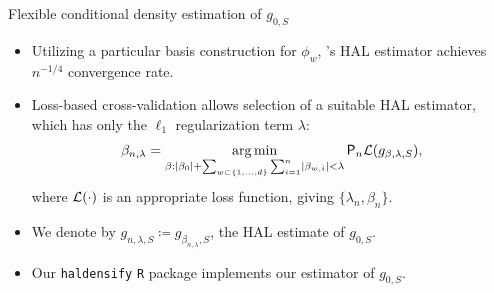 \documentclass{beamer}
\begin{document}
\begin{frame}[c]{Flexible conditional density estimation of $g_{0,S}$}

\begin{center}
\begin{itemize}
  \itemsep8pt
  \item Utilizing a particular basis construction for $\phi_w$,
    \citet{vdl2017generally}'s HAL estimator achieves $n^{-1/4}$
    convergence rate\footnotemark.
  \item Loss-based cross-validation allows selection of a suitable HAL
    estimator, which has only the $\ell_1$ regularization term $\lambda$:
    {\small{
    \begin{equation*}
      \beta_{n, \lambda}= \operatorname*{arg\,min}_{\beta: \lvert \beta_0 \rvert + \sum_{w
        \subset\{1,\ldots,d\}} \sum_{i=1}^{n} \lvert \beta_{w,i} \rvert <
        \lambda} \mathsf{P}_n \mathcal{L}(g_{\beta,\lambda,S}),
    \end{equation*} }
    }
    where $\mathcal{L}(\cdot)$ is an appropriate loss function, giving
    $\{\lambda_n, \beta_n\}$.
  \item We denote by $g_{n,\lambda,S} \coloneqq g_{\beta_{n, \lambda},S}$, the
    HAL estimate of $g_{0,S}$.
  \item Our \texttt{haldensify} \texttt{R} package implements our estimator of
    $g_{0,S}$.
\end{itemize}
\end{center}



\end{frame}

\end{document}
